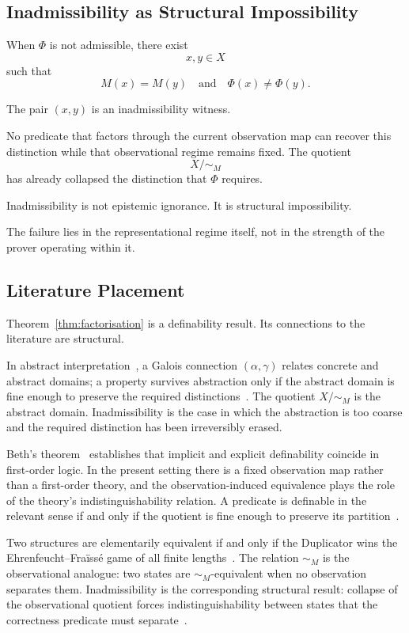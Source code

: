 \documentclass[12pt]{article}
\theoremstyle{plain}
\theoremstyle{definition}
\theoremstyle{remark}
\begin{document}
\subsection{Inadmissibility as Structural Impossibility}

When $\Phi$ is not admissible, there exist
\[
x, y \in X
\]
such that
\[
M(x) = M(y)
\quad\text{and}\quad
\Phi(x) \neq \Phi(y).
\]

The pair $(x,y)$ is an inadmissibility witness.

No predicate that factors through the current observation map can
recover this distinction while that observational regime remains fixed.
The quotient
\[
X/{\sim_M}
\]
has already collapsed the distinction that $\Phi$ requires.

Inadmissibility is not epistemic ignorance.
It is structural impossibility.

The failure lies in the representational regime itself, not in the
strength of the prover operating within it.

\subsection{Literature Placement}
\label{subsec:literature}

Theorem~\ref{thm:factorisation} is a definability result.
Its connections to the literature are structural.

In abstract interpretation~\cite{cousot1977,cousot1979}, a Galois
connection $(\alpha,\gamma)$ relates concrete and abstract domains;
a property survives abstraction only if the abstract domain is fine
enough to preserve the required distinctions~\cite{cousot2002,giacobazzi1998}.
The quotient $X/{\sim_M}$ is the abstract domain.
Inadmissibility is the case in which the abstraction is too coarse
and the required distinction has been irreversibly erased.

Beth's theorem~\cite{beth1953} establishes that implicit and explicit
definability coincide in first-order logic.
In the present setting there is a fixed observation map rather than a
first-order theory, and the observation-induced equivalence plays the
role of the theory's indistinguishability relation.
A predicate is definable in the relevant sense if and only if the
quotient is fine enough to preserve its partition~\cite{hodges1993}.

Two structures are elementarily equivalent if and only if the
Duplicator wins the Ehrenfeucht--Fra\"{i}ss\'{e} game of all finite
lengths~\cite{ehrenfeucht1961,fraisse1954}.
The relation $\sim_M$ is the observational analogue: two states are
$\sim_M$-equivalent when no observation separates them.
Inadmissibility is the corresponding structural result: collapse of
the observational quotient forces indistinguishability between states
that the correctness predicate must separate~\cite{libkin2004}.
\end{document}
